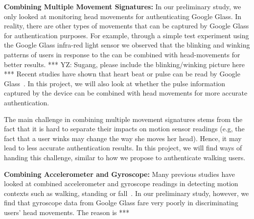 \vspace{4pt}\textbf{Combining Multiple Movement Signatures:} In our preliminary study, we only looked at monitoring head movements for authenticating Google Glass. In reality, there are other types of movements that can be captured by Google Glass for authentication purposes. For example, through a simple test experiment using the Google Glass
infra-red light sensor we observed that the blinking and winking patterns of users in
response to the can be combined with head-movements for better results. *** YZ: Sugang, please include the blinking/winking picture here *** Recent studies have shown that heart beat or pulse can be read by Google Glass~\cite{hernandezbioglass}. In this project, we will also look at whether the pulse information captured by the device can be combined with head movements for more accurate authentication.

The main challenge in combining multiple movement signatures stems from the fact that it is hard to separate their impacts on motion sensor readings (e.g, the fact that a user winks may change the way she moves her head). Hence, it may lead to less accurate authentication results. In this project, we will find ways of handing this challenge, similar to how we propose to authenticate walking users.

\vspace{4pt}\textbf{Combining Accelerometer and Gyroscope:} Many previous studies have looked at combined accelerometer and gyroscope readings in detecting motion contexts such as walking, standing or fall~\cite{mayagoitia2002accelerometer,jovanov2005wireless,li2009accurate,zhu2004real,williamson2001detecting,sabatini2005assessment}. In our preliminary study, however, we find that gyroscope data from Goolge Glass fare very poorly in discriminating users' head movements. The reason is ***
